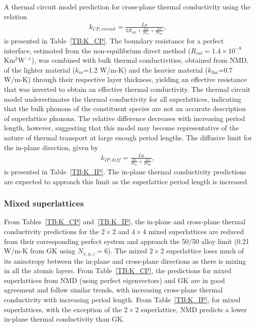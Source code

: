\documentclass[aps,prb,preprint,preprintnumbers,amsmath,amssymb,floatfix,superscriptaddress]{revtex4}
\begin{document}
A thermal circuit model prediction for cross-plane thermal conductivity using the relation\cite{PhysRevB.77.184302}
\begin{equation}\label{EQ:TCircuit}
\begin{split}
k_{CP,circuit}= \frac{La}{2R_{int}+\frac{La}{2k_m}+\frac{La}{2k_{3m}}},
\end{split}
\end{equation}
is presented in Table~\ref{TB:K_CP}. The boundary resistance for a perfect interface, estimated from the non-equilibrium direct method ($R_{int}=1.4\times10^{-8}$ Km$^2$W$^{-1}$), was combined with bulk thermal conductivities, obtained from NMD, of the lighter material ($k_{m}$=1.2 W/m-K) and the heavier material ($k_{3m}$=0.7 W/m-K) through their respective layer thickness, yielding an effective resistance that was inverted to obtain an effective thermal conductivity. The thermal circuit model underestimates the thermal conductivity for all superlattices, indicating that the bulk phonons of the constituent species are not an accurate description of superlattice phonons. The relative difference decreases with increasing period length, however, suggesting that this model may become representative of the nature of thermal transport at large enough period lengths.
The diffusive limit for the in-plane direction, given by \cite{PhysRevB.77.184302}
\begin{equation}\label{EQ:TCircuit}
\begin{split}
k_{IP,diff}= \frac{La}{\frac{La}{2k_m}+\frac{La}{2k_{3m}}},
\end{split}
\end{equation}
is presented in Table~\ref{TB:K_IP}. The in-plane thermal conductivity predictions are expected to approach this limit as the superlattice period length is increased.

\subsubsection{Mixed superlattices}
From Tables~\ref{TB:K_CP} and~\ref{TB:K_IP}, the in-plane and cross-plane thermal conductivity predictions for the $2\times 2$ and $4\times 4$ mixed superlattices are reduced from their corresponding perfect system and approach the 50/50 alloy limit (0.21 W/m-K from GK using $N_{x,y,z}=6$). The mixed $2\times 2$ superlattice loses much of its anisotropy between the in-plane and cross-plane directions as there is mixing in all the atomic layers. From Table~\ref{TB:K_CP}, the predictions for mixed superlattices from NMD (using perfect eigenvectors) and GK are in good agreement and follow similar trends, with increasing cross-plane thermal conductivity with increasing period length. From Table~\ref{TB:K_IP}, for mixed superlattices, with the exception of  the $2 \times 2$ superlattice, NMD predicts a lower in-plane thermal conductivity than GK.
\end{document}
